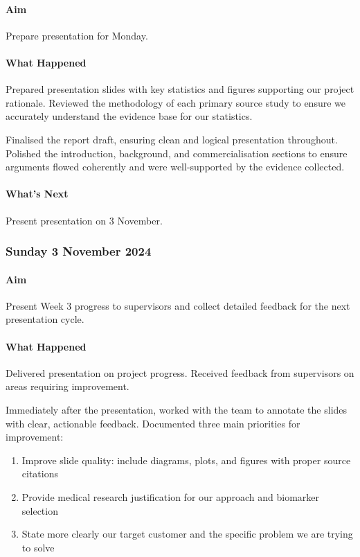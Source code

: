\paragraph{Aim}
Prepare presentation for Monday.

\paragraph{What Happened}
Prepared presentation slides with key statistics and figures supporting our project rationale. Reviewed the methodology of each primary source study to ensure we accurately understand the evidence base for our statistics.

Finalised the report draft, ensuring clean and logical presentation throughout. Polished the introduction, background, and commercialisation sections to ensure arguments flowed coherently and were well-supported by the evidence collected.

\paragraph{What's Next}
Present presentation on 3 November.

\subsubsection*{Sunday 3 November 2024}

\paragraph{Aim}
Present Week 3 progress to supervisors and collect detailed feedback for the next presentation cycle.

\paragraph{What Happened}
Delivered presentation on project progress. Received feedback from supervisors on areas requiring improvement.

Immediately after the presentation, worked with the team to annotate the slides with clear, actionable feedback. Documented three main priorities for improvement:
\begin{enumerate}
    \item Improve slide quality: include diagrams, plots, and figures with proper source citations
    \item Provide medical research justification for our approach and biomarker selection
    \item State more clearly our target customer and the specific problem we are trying to solve
\end{enumerate}

